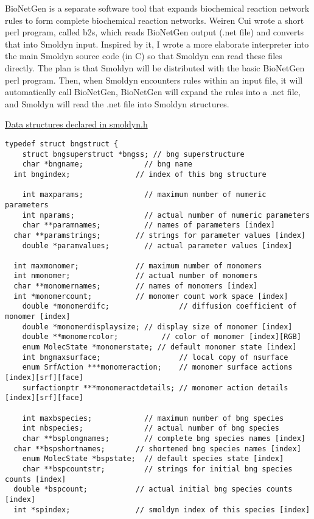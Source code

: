 \documentclass {book}
\begin{document}
BioNetGen is a separate software tool that expands biochemical reaction network rules to form complete biochemical reaction networks.  Weiren Cui wrote a short perl program, called b2s, which reads BioNetGen output (.net file) and converts that into Smoldyn input.  Inspired by it, I wrote a more elaborate interpreter into the main Smoldyn source code (in C) so that Smoldyn can read these files directly.  The plan is that Smoldyn will be distributed with the basic BioNetGen perl program.  Then, when Smoldyn encounters rules within an input file, it will automatically call BioNetGen, BioNetGen will expand the rules into a .net file, and Smoldyn will read the .net file into Smoldyn structures.

\underline{Data structures declared in smoldyn.h}

\begin{lstlisting}
typedef struct bngstruct {
	struct bngsuperstruct *bngss; // bng superstructure
	char *bngname;              // bng name
  int bngindex;               // index of this bng structure
  
	int maxparams;              // maximum number of numeric parameters
	int nparams;                // actual number of numeric parameters
	char **paramnames;          // names of parameters [index]
  char **paramstrings;        // strings for parameter values [index]
	double *paramvalues;        // actual parameter values [index]
  
  int maxmonomer;             // maximum number of monomers
  int nmonomer;               // actual number of monomers
  char **monomernames;        // names of monomers [index]
  int *monomercount;          // monomer count work space [index]
	double *monomerdifc;				// diffusion coefficient of monomer [index]
	double *monomerdisplaysize;	// display size of monomer [index]
	double **monomercolor;			// color of monomer [index][RGB]
	enum MolecState *monomerstate; // default monomer state [index]
	int bngmaxsurface;					// local copy of nsurface
	enum SrfAction ***monomeraction;	// monomer surface actions [index][srf][face]
	surfactionptr ***monomeractdetails;	// monomer action details [index][srf][face]

	int maxbspecies;            // maximum number of bng species
	int nbspecies;              // actual number of bng species
	char **bsplongnames;        // complete bng species names [index]
  char **bspshortnames;       // shortened bng species names [index]
	enum MolecState *bspstate;	// default species state [index]
	char **bspcountstr;         // strings for initial bng species counts [index]
  double *bspcount;           // actual initial bng species counts [index]
  int *spindex;               // smoldyn index of this species [index]


\end{lstlisting}
\end{document}
